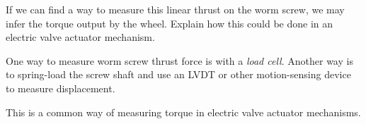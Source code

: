 If we can find a way to measure this linear thrust on the worm screw, we may infer the torque output by the wheel.  Explain how this could be done in an electric valve actuator mechanism.







One way to measure worm screw thrust force is with a {\it load cell}.  Another way is to spring-load the screw shaft and use an LVDT or other motion-sensing device to measure displacement.
 






This is a common way of measuring torque in electric valve actuator mechanisms.




